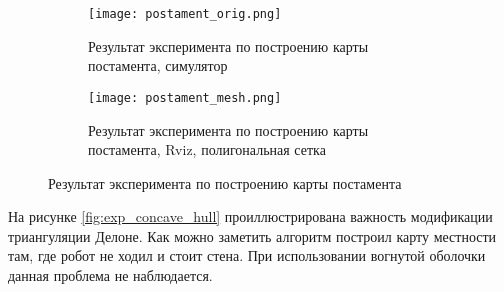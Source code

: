 \begin{figure}[h]
    \begin{subfigure}{0.9\textwidth}
        \centering\texttt{[image: postament\_orig.png]}
        \caption{Результат эксперимента по построению карты постамента, симулятор}
        \label{fig:postament_orig.png}
    \end{subfigure}
    \begin{subfigure}{0.9\textwidth}
        \centering\texttt{[image: postament\_mesh.png]}
        \caption{Результат эксперимента по построению карты постамента, Rviz, полигональная сетка}
        \label{fig:postament_mesh.png}
    \end{subfigure}

\caption{Результат эксперимента по построению карты постамента}
\label{fig:}
\end{figure}

На рисунке \ref{fig:exp_concave_hull} проиллюстрирована  важность модификации триангуляции Делоне. Как можно заметить  алгоритм построил карту местности там, где робот не ходил и стоит стена. При использовании вогнутой оболочки  данная проблема не наблюдается.

